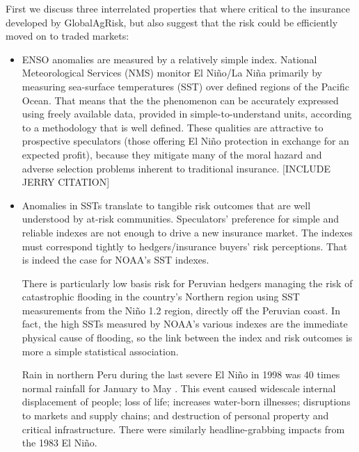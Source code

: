 \documentclass[authoryear]{article}
\begin{document}
First we discuss three interrelated properties that where critical to the insurance developed by GlobalAgRisk, but also suggest that the risk could be efficiently moved on to traded markets:
\begin{itemize}
\item ENSO anomalies are measured by a relatively simple index.
National Meteorological Services (NMS) monitor El Ni\~no/La Ni\~na primarily by measuring sea-surface temperatures (SST) over defined regions of the Pacific Ocean. That means that the the phenomenon can be accurately expressed using freely available data, provided in simple-to-understand units, according to a methodology that is well defined. These qualities are attractive to prospective speculators (those offering El Ni\~no protection in exchange for an expected profit), because they mitigate many of the moral hazard and adverse selection problems inherent to traditional insurance. [INCLUDE JERRY CITATION] 
\item Anomalies in SSTs translate to tangible risk outcomes that are well understood by at-risk communities.
Speculators' preference for simple and reliable indexes are not enough to drive a new insurance market. The indexes must correspond tightly to hedgers/insurance buyers' risk perceptions. That is indeed the case for NOAA's SST indexes. 

There is particularly low basis risk for Peruvian hedgers managing the risk of catastrophic flooding in the country's Northern region using SST measurements from the Ni\~no 1.2 region, directly off the Peruvian coast. In fact, the high SSTs measured by NOAA's various indexes are the immediate physical cause of flooding, so the link between the index and risk outcomes is more a simple statistical association\cite{khalil2007nino}. 

Rain in northern Peru during the last severe El Ni\~no in 1998 was 40 times normal rainfall for January to May \citep{skees2009enso}. This event caused widescale internal displacement of people; loss of life; increases water-born illnesses; disruptions to markets and supply chains; and destruction of personal property and critical infrastructure. There were similarly headline-grabbing impacts from the 1983 El Ni\~no.


\end{itemize}
\end{document}
